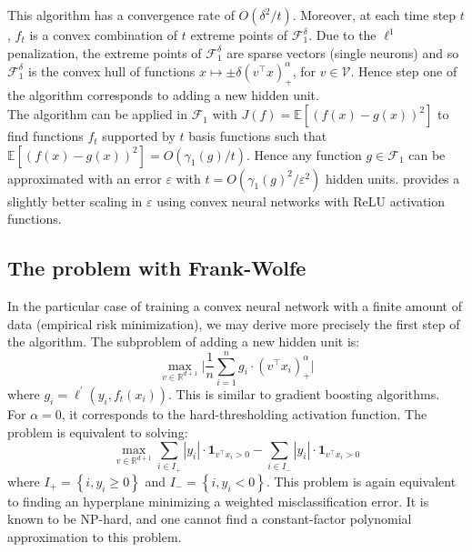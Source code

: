 \documentclass[a4paper, 11pt]{scrartcl}
\begin{document}
{This algorithm has a convergence rate of $O(\delta^2 /t)$. Moreover, at each time step $t$, $f_t$ is a convex combination of $t$ extreme points of $\mathcal{F}_1^\delta$. Due to the $\ell^1$ penalization, the extreme points of $\mathcal{F}_1^\delta$ are sparse vectors (single neurons) and so $\mathcal{F}_1^\delta$ is the convex hull of functions $x \mapsto \pm \delta  (v^\top x)^\alpha_{+}$, for $v \in \mathcal{V}$. Hence step one of the algorithm corresponds to adding a new hidden unit.\\


The algorithm can be applied in $\mathcal{F}_1$ with $J(f) = \mathbb{E}\left[(f(x) - g(x))^2\right]$ to find functions $f_t$ supported by $t$ basis functions such that $\mathbb{E}\left[(f(x) - g(x))^2\right] = O(\gamma_1(g) /t)$. Hence any function $g \in \mathcal{F}_1$ can be approximated with an error $\varepsilon$ with $t = O(\gamma_1(g)^2 /\varepsilon^2)$ hidden units. \cite{bach2017breaking} provides a slightly better scaling in $\varepsilon$ using convex neural networks with ReLU activation functions.

\subsection{The problem with Frank-Wolfe}

In the particular case of training a convex neural network with a finite amount of data (empirical risk minimization), we may derive more precisely the first step of the algorithm. The subproblem of adding a new hidden unit is:
\begin{equation}
\max_{v \in \mathbb{R}^{d+1}} \Biggl\lvert\frac{1}{n} \sum_{i=1}^n g_i \cdot (v^\top x_i)^\alpha_+ \Biggr\rvert
\end{equation}
where $g_i = \ell^\prime(y_i, f_t(x_i))$. This is similar to gradient boosting algorithms.\\

For $\alpha = 0$, it corresponds to the hard-thresholding activation function. The problem is equivalent to solving:
\begin{equation}
\max_{v \in \mathbb{R}^{d+1}} \sum_{i\in I_+} |y_i| \cdot \mathbf{1}_{v^\top x_i> 0}  - \sum_{i\in I_-} |y_i| \cdot \mathbf{1}_{v^\top x_i> 0}
\end{equation}
where $I_+ = \left\{i, y_i \geq 0 \right\}$ and $I_- = \left\{i, y_i < 0 \right\}$. This problem is again equivalent to finding an hyperplane minimizing a weighted misclassification error. It is known to be NP-hard, and one cannot find a constant-factor polynomial approximation to this problem.\\

}
\end{document}

